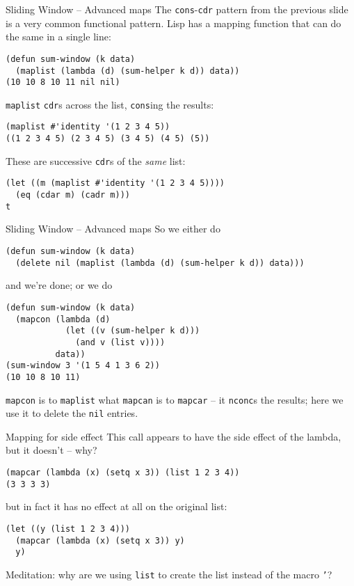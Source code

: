 \documentclass[presentation]{beamer}
\begin{document}
\begin{frame}[fragile]{Sliding Window -- Advanced maps}
The \texttt{cons}-\texttt{cdr} pattern from the previous slide is a very common functional pattern.  Lisp has a mapping function that can do the same in a single line:
\begin{verbatim}
(defun sum-window (k data)
  (maplist (lambda (d) (sum-helper k d)) data))
(10 10 8 10 11 nil nil)
\end{verbatim}
\texttt{maplist} \texttt{cdr}s across the list, \texttt{cons}ing the results:
\begin{verbatim}
(maplist #'identity '(1 2 3 4 5))
((1 2 3 4 5) (2 3 4 5) (3 4 5) (4 5) (5))
\end{verbatim}
These are successive \texttt{cdr}s of the \emph{same} list:
\begin{verbatim}
(let ((m (maplist #'identity '(1 2 3 4 5))))
  (eq (cdar m) (cadr m)))
t
\end{verbatim}
\end{frame}

\begin{frame}[fragile]{Sliding Window -- Advanced maps}
So we either do
\begin{verbatim}
(defun sum-window (k data)
  (delete nil (maplist (lambda (d) (sum-helper k d)) data)))
\end{verbatim}
and we're done; or we do
\begin{verbatim}
(defun sum-window (k data)
  (mapcon (lambda (d)
            (let ((v (sum-helper k d)))
              (and v (list v))))
          data))
(sum-window 3 '(1 5 4 1 3 6 2))
(10 10 8 10 11)
\end{verbatim}
\texttt{mapcon} is to \texttt{maplist} what \texttt{mapcan} is to \texttt{mapcar} -- it \texttt{nconc}s the results; here we use it to delete the \texttt{nil} entries.

\end{frame}
\begin{frame}[fragile]{Mapping for side effect}
This call appears to have the side effect of the lambda, but it doesn't -- why?
\begin{verbatim}
(mapcar (lambda (x) (setq x 3)) (list 1 2 3 4))
(3 3 3 3)
\end{verbatim}
but in fact it has no effect at all on the original list:
\begin{verbatim}
(let ((y (list 1 2 3 4)))
  (mapcar (lambda (x) (setq x 3)) y)
  y)
\end{verbatim}
Meditation: why are we using \texttt{list} to create the list instead of the macro \texttt{'}?
\end{frame}
\end{document}
